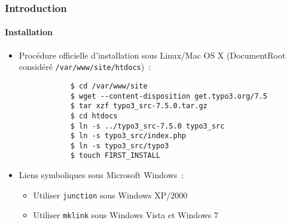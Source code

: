 \begin{frame}[fragile]
	\frametitle{Introduction}
	\framesubtitle{Installation}

	\begin{itemize}
		\item Procédure officielle d'installation sous Linux/Mac OS X\newline
			(DocumentRoot considéré \texttt{/var/www/site/htdocs})~:
		\begin{lstlisting}
			$ cd /var/www/site
			$ wget --content-disposition get.typo3.org/7.5
			$ tar xzf typo3_src-7.5.0.tar.gz
			$ cd htdocs
			$ ln -s ../typo3_src-7.5.0 typo3_src
			$ ln -s typo3_src/index.php
			$ ln -s typo3_src/typo3
			$ touch FIRST_INSTALL
		\end{lstlisting}

		\item Liens symboliques sous Microsoft Windows~:

			\begin{itemize}
				\item Utiliser \texttt{junction} sous Windows XP/2000
				\item Utiliser \texttt{mklink} sous Windows Vista et Windows 7
			\end{itemize}

	\end{itemize}
\end{frame}

